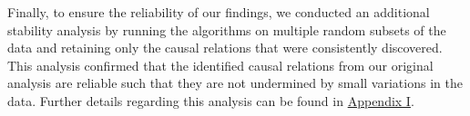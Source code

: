 \documentclass[twoside, 11pt]{article}
\begin{document}

Finally, to ensure the reliability of our findings, we conducted an additional stability analysis by running the algorithms on multiple random subsets of the data and retaining only the causal relations that were consistently discovered. This analysis confirmed that the identified causal relations from our original analysis are reliable such that they are not undermined by small variations in the data. Further details regarding this analysis can be found in \hyperref[stability]{Appendix I}.


\end{document}
